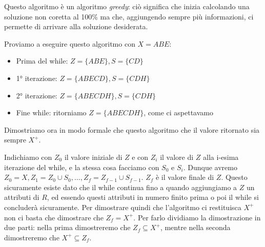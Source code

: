 \documentclass[11pt, a4paper, titlepage, oneside]{scrbook}
\begin{document}
\NB Questo algoritmo è un algoritmo \textit{greedy}: ciò significa che inizia calcolando una soluzione non coretta al 100\% ma che, aggiungendo sempre più informazioni, ci permette di arrivare alla soluzione desiderata.

Proviamo a eseguire questo algoritmo con $X = ABE$:
\begin{itemize}
    \item Prima del while: $Z = \{ABE\}, S = \{CD\}$
    \item 1° iterazione: $Z = \{ABECD\}, S = \{CDH\}$
    \item 2° iterazione: $Z = \{ABECDH\}, S = \{CDH\}$
    \item Fine while: ritorniamo $Z = \{ABECDH\}$, come ci aspettavamo
\end{itemize}

Dimostriamo ora in modo formale che questo algoritmo che il valore ritornato sia sempre $X^+$.

\Dimostrazione \nopagebreak

Indichiamo con $Z_0$ il valore iniziale di $Z$ e con $Z_i$ il valore di $Z$ alla i-esima iterazione del while, e la stessa cosa facciamo con $S_0$ e $S_i$. Dunque avremo $Z_0 = X, Z_1 = Z_0 \cup S_0, \ldots, Z_f = Z_{f-1} \cup S_{f-1}$. $Z_f$ è il valore finale di $Z$. Questo sicuramente esiste dato che il while continua fino a quando aggiungiamo a $Z$ un attributi di $R$, ed essendo questi attributi in numero finito prima o poi il while si concluderà sicuramente. Per dimostrare quindi che l'algoritmo ci restituisca $X^+$ non ci basta che dimostrare che $Z_f = X^+$. Per farlo dividiamo la dimostrazione in due parti: nella prima dimostreremo che $Z_f \subseteq X^+$, mentre nella seconda dimostreremo che $X^+ \subseteq Z_f$.
\end{document}
